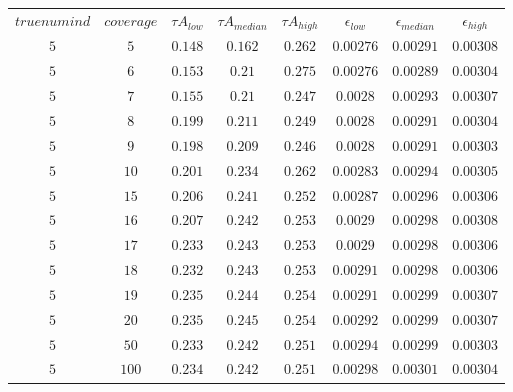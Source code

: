 \begin{table}[H]
\begin{tabular}{cccccccc}
$truenumind$ & $coverage$ & ${\tau}A_{low}$ & ${\tau}A_{median}$ & ${\tau}A_{high}$ & $\epsilon_{low}$ & $\epsilon_{median}$ & $\epsilon_{high}$\\
$5$ & $5$ & $0.148$ & $0.162$ & $0.262$ & $0.00276$ & $0.00291$ & $0.00308$\\
$5$ & $6$ & $0.153$ & $0.21$ & $0.275$ & $0.00276$ & $0.00289$ & $0.00304$\\
$5$ & $7$ & $0.155$ & $0.21$ & $0.247$ & $0.0028$ & $0.00293$ & $0.00307$\\
$5$ & $8$ & $0.199$ & $0.211$ & $0.249$ & $0.0028$ & $0.00291$ & $0.00304$\\
$5$ & $9$ & $0.198$ & $0.209$ & $0.246$ & $0.0028$ & $0.00291$ & $0.00303$\\
$5$ & $10$ & $0.201$ & $0.234$ & $0.262$ & $0.00283$ & $0.00294$ & $0.00305$\\
$5$ & $15$ & $0.206$ & $0.241$ & $0.252$ & $0.00287$ & $0.00296$ & $0.00306$\\
$5$ & $16$ & $0.207$ & $0.242$ & $0.253$ & $0.0029$ & $0.00298$ & $0.00308$\\
$5$ & $17$ & $0.233$ & $0.243$ & $0.253$ & $0.0029$ & $0.00298$ & $0.00306$\\
$5$ & $18$ & $0.232$ & $0.243$ & $0.253$ & $0.00291$ & $0.00298$ & $0.00306$\\
$5$ & $19$ & $0.235$ & $0.244$ & $0.254$ & $0.00291$ & $0.00299$ & $0.00307$\\
$5$ & $20$ & $0.235$ & $0.245$ & $0.254$ & $0.00292$ & $0.00299$ & $0.00307$\\
$5$ & $50$ & $0.233$ & $0.242$ & $0.251$ & $0.00294$ & $0.00299$ & $0.00303$\\
$5$ & $100$ & $0.234$ & $0.242$ & $0.251$ & $0.00298$ & $0.00301$ & $0.00304$\\
\end{tabular}
\end{table}
 
